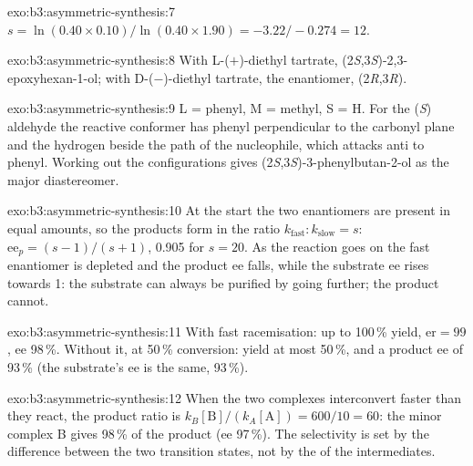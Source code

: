 \begin{solution}{exo:b3:asymmetric-synthesis:7}
$s = \ln(0.40 \times 0.10)/\ln(0.40 \times 1.90) = -3.22/-0.274 = 12$.
\end{solution}

\begin{solution}{exo:b3:asymmetric-synthesis:8}
With L-($+$)-diethyl tartrate, (2\textit{S},3\textit{S})-2,3-epoxyhexan-1-ol; with D-($-$)-diethyl tartrate, the
enantiomer, (2\textit{R},3\textit{R}).
\end{solution}

\begin{solution}{exo:b3:asymmetric-synthesis:9}
L = phenyl, M = methyl, S = H. For the (\textit{S}) aldehyde the reactive conformer has phenyl
perpendicular to the carbonyl plane and the hydrogen beside the path of the
nucleophile, which attacks anti to phenyl. Working out the configurations gives
(2\textit{S},3\textit{S})-3-phenylbutan-2-ol as the major diastereomer.
\end{solution}

\begin{solution}{exo:b3:asymmetric-synthesis:10}
At the start the two enantiomers are present in equal amounts, so the products
form in the ratio $k_{\mathrm{fast}} : k_{\mathrm{slow}} = s$: $\mathrm{ee}_p = (s - 1)/(s + 1)$, 0.905 for $s = 20$. As the reaction goes on the
fast enantiomer is depleted and the product ee falls, while the substrate ee rises
towards 1: the substrate can always be purified by going further; the product
cannot.
\end{solution}

\begin{solution}{exo:b3:asymmetric-synthesis:11}
With fast racemisation: up to 100\,\% yield, $\mathrm{er} = 99$, ee 98\,\%. Without it, at 50\,\%
conversion: yield at most 50\,\%, and a product ee of 93\,\% (the substrate's ee is the
same, 93\,\%).
\end{solution}

\begin{solution}{exo:b3:asymmetric-synthesis:12}
When the two complexes interconvert faster than they react, the product ratio is
$k_B[\mathrm B]/(k_A[\mathrm A]) = 600/10 = 60$: the minor complex B gives 98\,\% of the product (ee 97\,\%). The
selectivity is set by the difference between the two transition states, not by
the  of the intermediates.
\end{solution}

